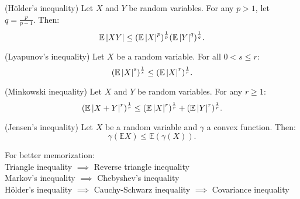 \documentclass{huhtakm-template-book}
\newcommand{\expect}{\mathbb{E}}
\begin{document}
    \begin{thm}(H\"older's inequality)
        Let $X$ and $Y$ be random variables. For any $p>1$, let $q=\frac{p}{p-1}$. Then:
        \begin{equation*}
            \expect\abs{XY}\leq(\expect\abs{X}^{p})^{\frac{1}{p}}(\expect\abs{Y}^{q})^{\frac{1}{q}}.
        \end{equation*}
    \end{thm}
    \begin{thm}(Lyapunov's inequality)
        Let $X$ be a random variable. For all $0<s\leq r$:
        \begin{equation*}
            (\expect\abs{X}^{s})^{\frac{1}{s}}\leq(\expect\abs{X}^{r})^{\frac{1}{r}}.
        \end{equation*}
    \end{thm}
    \begin{thm}(Minkowski inequality)
        Let $X$ and $Y$ be random variables. For any $r\geq 1$:
        \begin{equation*}
            (\expect\abs{X+Y}^{r})^{\frac{1}{r}}\leq(\expect\abs{X}^{r})^{\frac{1}{r}}+(\expect\abs{Y}^{r})^{\frac{1}{r}}.
        \end{equation*}
    \end{thm}
    \begin{thm}(Jensen's inequality)
        Let $X$ be a random variable and $\gamma$ a convex function. Then:
        \begin{equation*}
            \gamma(\expect X)\leq\expect(\gamma(X)).
        \end{equation*}
    \end{thm}
    For better memorization:\\
    Triangle inequality $\implies$ Reverse triangle inequality\\
    Markov's inequality $\implies$ Chebyshev's inequality\\
    H\"older's inequality $\implies$ Cauchy-Schwarz inequality $\implies$ Covariance inequality
\end{document}
